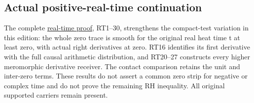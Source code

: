 \documentclass[
  10pt,
  a4paper,
]{article}
\begin{document}
\subsection{Actual positive-real-time
continuation}\label{actual-positive-real-time-continuation}

The complete \href{REAL_TIME_HEAT_TRACE_DERIVATION.md}{real-time proof},
RT1--30, strengthens the compact-test variation in this edition: the
whole zero trace is smooth for the original real heat time t at least
zero, with actual right derivatives at zero. RT16 identifies its first
derivative with the full causal arithmetic distribution, and RT20--27
constructs every higher meromorphic derivative receiver. The contact
comparison retains the unit and inter-zero terms. These results do not
assert a common zero strip for negative or complex time and do not prove
the remaining RH inequality. All original supported carriers remain
present.
\end{document}
